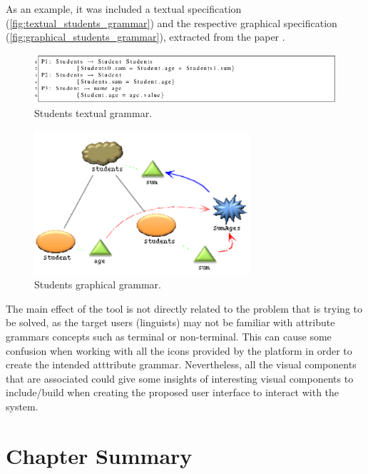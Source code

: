 As an example, it was included a textual specification (\autoref{fig:textual_students_grammar}) and the respective graphical specification (\autoref{fig:graphical_students_grammar}), extracted from the paper \cite{oliveira_2009}.
    
\begin{figure}[h]
    \centering
    \includegraphics[width=15cm]{images/textual_students_grammar.png}
    \caption{Students textual grammar.}
    \label{fig:textual_students_grammar}
\end{figure}

\newpage

\begin{figure}[h]
    \centering
    \includegraphics[width=8cm]{images/graphical_students_grammar.png}
    \caption{Students graphical grammar.}
    \label{fig:graphical_students_grammar}
\end{figure}

The main effect of the tool is not directly related to the problem that is trying to be solved, as the target users (linguists) may not be familiar with attribute grammars concepts such as 
terminal or non-terminal.
This can cause some confusion when working with all the icons provided by the platform in order to create the intended atttribute grammar.
Nevertheless, all the visual components that are associated could give some insights of interesting visual components to include/build when creating the proposed user interface to interact with the system.


\section{Chapter Summary} %

